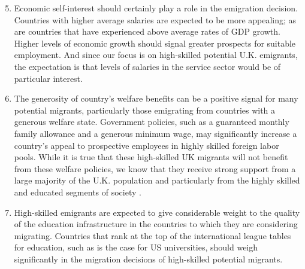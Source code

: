 \documentclass[12pt]{article}
\begin{document}
\begin{enumerate}
\setcounter{enumi}{4}
\item Economic self-interest should certainly play a role in the emigration decision. Countries with higher average salaries are expected to be more appealing; as are countries that have experienced above average rates of GDP growth.  Higher levels of economic growth should signal greater prospects for suitable employment.  And since our focus is on high-skilled potential U.K. emigrants, the expectation is that levels of salaries in the service sector would be of particular interest.

\item The generosity of country's welfare benefits can be a positive signal for many potential migrants, particularly those emigrating from countries with a generous welfare state.  Government policies, such as a guaranteed monthly family allowance and a generous minimum wage, may significantly increase a country's appeal to prospective employees in highly skilled foreign labor pools.  While it is true that these high-skilled UK migrants will not benefit from these welfare policies, we know that they receive strong support from a large majority of the U.K. population and particularly from the highly skilled and educated segments of society \citep{Heathetal1994}.

\item High-skilled emigrants are expected to give considerable weight to the quality of the education infrastructure in the countries to which they are considering migrating.  Countries that rank at the top of the international league tables for education, such as is the case for US universities, should weigh significantly in the migration decisions of high-skilled potential migrants.

\end{enumerate}


\end{document}
